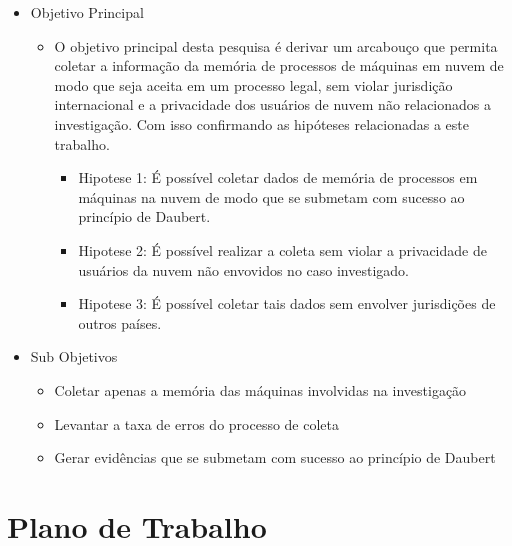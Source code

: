 \documentclass[
	12pt,				%
	openright,			%
	oneside,			%
	a4paper,			%
	english,			%
	french,				%
	spanish,			%
	brazil,				%
	]{abntex2}
\begin{document}
\begin{itemize}
 \item Objetivo Principal

 \begin{itemize}
  \item O objetivo principal desta pesquisa é derivar um arcabouço que permita coletar a informação da memória de processos de máquinas em nuvem de modo que seja aceita em um processo legal,
 sem violar jurisdição internacional e a privacidade dos usuários de nuvem não relacionados a investigação. Com isso confirmando as hipóteses relacionadas a este trabalho.
 
 \begin{itemize}
  \item Hipotese 1: É possível coletar dados de memória de processos em máquinas na nuvem de modo que se submetam com sucesso ao princípio de Daubert.
  \item Hipotese 2: É possível realizar a coleta sem violar a privacidade de usuários da nuvem não envovidos no caso investigado.
  \item Hipotese 3: É possível coletar tais dados sem envolver jurisdições de outros países.
 \end{itemize}
 
 \end{itemize}
 
\end{itemize}

\begin{itemize}
 \item Sub Objetivos

 \begin{itemize}
  \item Coletar apenas a memória das máquinas involvidas na investigação
  \item Levantar a taxa de erros do processo de coleta
  \item Gerar evidências que se submetam com sucesso ao princípio de Daubert
 \end{itemize}
 
\end{itemize}


\chapter{Plano de Trabalho}
\end{document}
